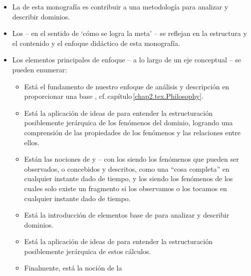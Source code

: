 \vspace*{-4mm}

\begin{itemize}
\item La  de esta monografía es contribuir a una 
      metodología para analizar y describir dominios.
  
\item Los  -- en el sentido de `cómo se logra la meta' -- se reflejan en la estructura y el contenido
      y el enfoque didáctico de esta monografía.
\item Los elementos principales de  enfoque -- a lo largo de un
  eje conceptual -- se pueden enumerar: 
\begin{itemize}
\item Está el fundamento de nuestro enfoque de análisis y descripción
      en proporcionar una base ,
      cf.\,capítulo\,\ref{chap2.tex.Philosophy}. 
\item Está la aplicación de ideas de  
      para entender la estructuración posiblemente jerárquica
      de los fenómenos del dominio, logrando una comprensión de las propiedades
      de los fenómenos y las relaciones entre ellos.
\item Están las nociones de  y  -- %
      con los    siendo los fenómenos
\begynd
\pind que pueden ser observados, o concebidos y descritos, como \nyl una ``cosa completa'' en cualquier instante dado de tiempo,
\afslut
      y los    siendo los fenómenos 
\begynd
\pind de los cuales solo existe un fragmento\pos{}{\\} si los observamos o
      los tocamos\pos{}{\\} en cualquier instante dado de tiempo.
\afslut
\item Está la introducción de elementos base de
         para analizar y
      describir dominios. 
\item Está la aplicación de ideas de  
      para entender la estructuración posiblemente jerárquica
      de estos cálculos. 
\item Finalmente, está la noción de la

\end{itemize}
\end{itemize}
